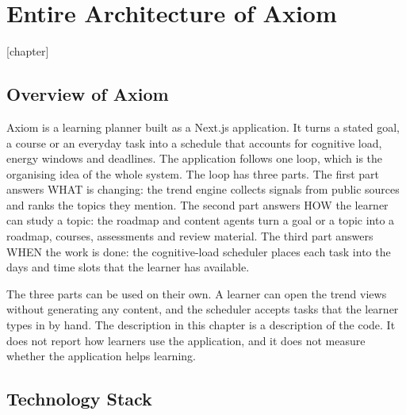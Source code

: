 \chapter{Entire Architecture of Axiom}
\label{ch:implementation}

[chapter]
\renewcommand{\thelistingnum}{\thechapter.\arabic{listingnum}}
\newcommand{\ListingCaption}[1]{%
  \Needspace{14\baselineskip}\par\medskip\refstepcounter{listingnum}%
  \noindent\textbf{Listing \thelistingnum:} #1\par\nopagebreak\smallskip}

\captionsetup[lstlisting]{justification=raggedright, singlelinecheck=false}

\section{Overview of Axiom}
\label{sec:axiom-overview}

Axiom is a learning planner built as a Next.js application. It turns a stated goal, a course or an everyday task into a schedule that accounts for cognitive load, energy windows and deadlines. The application follows one loop, which is the organising idea of the whole system. The loop has three parts. The first part answers WHAT is changing: the trend engine collects signals from public sources and ranks the topics they mention. The second part answers HOW the learner can study a topic: the roadmap and content agents turn a goal or a topic into a roadmap, courses, assessments and review material. The third part answers WHEN the work is done: the cognitive-load scheduler places each task into the days and time slots that the learner has available.

The three parts can be used on their own. A learner can open the trend views without generating any content, and the scheduler accepts tasks that the learner types in by hand. The description in this chapter is a description of the code. It does not report how learners use the application, and it does not measure whether the application helps learning.

\section{Technology Stack}
\label{sec:axiom-tools}

